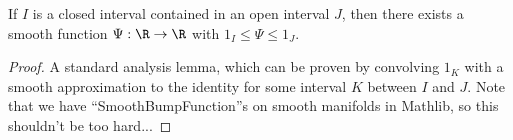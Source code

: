 \begin{lemma}
\label{smooth-ury}
\leanok
If $I$ is a closed interval contained in an open interval $J$, then there exists a smooth
  function $\Psi: \R \to \R$ with $1_I \leq \Psi \leq 1_J$.
\end{lemma}
\begin{proof}
\leanok
A standard analysis lemma, which can be proven by convolving $1_K$ with a smooth approximation
  to the identity for some interval $K$ between $I$ and $J$. Note that we have
  ``SmoothBumpFunction''s on smooth manifolds in Mathlib, so this shouldn't be too hard...
\end{proof}

